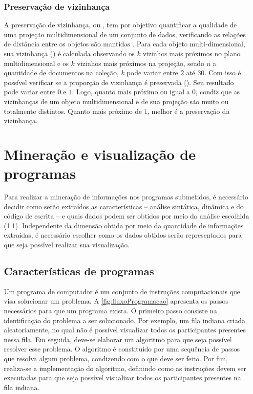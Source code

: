 			\subsubsection{Preservação de vizinhança}
			\label{subsubsec:vizinhanca}
			
				A preservação de vizinhança, ou 
				\cite{paulovich2008hipp}, tem por objetivo quantificar a qualidade de uma
				projeção multidimensional de um conjunto de dados, verificando as relações
				de distância entre os objetos são mantidas \cite{phd:paulovich}. Para cada
				objeto multi-dimensional, sua vizinhança () é calculada
				observando os $k$ vizinhos mais próximos no plano multidimensional e os $k$
				vizinhos mais próximos na projeção, sendo $n$ a quantidade de documentos na
				coleção, $k$ pode variar entre $2$ até $30$. Com isso é possível verificar
				se a proporção de vizinhança é preservada (). Seu
				resultado pode variar entre $0$ e $1$. Logo, quanto mais próximo ou igual
				a $0$, condiz que as vizinhanças de um objeto multidimensional e de sua
				projeção são muito ou totalmente distintos. Quanto mais próximo de $1$,
				melhor é a preservação da vizinhança.

	\section{Mineração e visualização de programas}
	\label{sec:MinVisual}
		Para realizar a mineração de informações nos programas submetidos, é necessário
		decidir como serão extraídos as características -- análise sintática, dinâmica e
		do código de escrita -- e quais dados podem ser obtidos por meio da análise
		escolhida (\cref{subSec:Caracteristicas}). Independente da dimensão
		obtida por meio da quantidade de informações extraídas, é necessário escolher
		como os dados obtidos serão representados para que seja possível realizar sua visualização.
		
		\subsection{Características de programas}
		\label{subSec:Caracteristicas}
			
			Um programa de computador é um conjunto de instruções computacionais que visa
			solucionar um problema. A \cref{fig:fluxoProgramacao} apresenta os passos
			necessários para que um programa exista. O primeiro passo consiste na
			identificação do problema a ser solucionado. Por exemplo, um fila indiana
			criada aleatoriamente, no qual não é possível visualizar todos os participantes
			presentes nessa fila. Em seguida, deve-se elaborar um algoritmo para que seja
			possível resolver esse problema. O algoritmo é constituído por uma sequência
			de passos que resolva algum problema, condizendo com o que deve ser feito.
			Por fim, realiza-se a implementação do algoritmo, definindo como as instruções
			devem ser executadas para que seja possível visualizar todos os participantes
			presentes na fila indiana.

